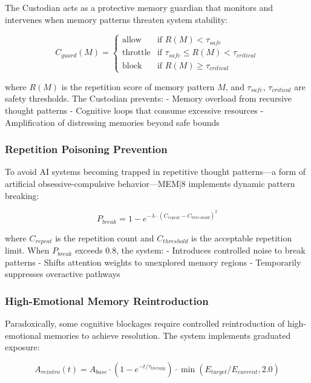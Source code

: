 \documentclass[11pt,letterpaper]{article}
\begin{document}
The Custodian acts as a protective memory guardian that monitors and intervenes when memory patterns threaten system stability:

\begin{equation}
C_{guard}(M) = \begin{cases}
\text{allow} & \text{if } R(M) < \tau_{safe} \\
\text{throttle} & \text{if } \tau_{safe} \leq R(M) < \tau_{critical} \\
\text{block} & \text{if } R(M) \geq \tau_{critical}
\end{cases}
\end{equation}

where $R(M)$ is the repetition score of memory pattern $M$, and $\tau_{safe}$, $\tau_{critical}$ are safety thresholds. The Custodian prevents:
- Memory overload from recursive thought patterns
- Cognitive loops that consume excessive resources
- Amplification of distressing memories beyond safe bounds

\subsubsection{Repetition Poisoning Prevention}

To avoid AI systems becoming trapped in repetitive thought patterns—a form of artificial obsessive-compulsive behavior—MEM|8 implements dynamic pattern breaking:

\begin{equation}
P_{break} = 1 - e^{-\lambda \cdot (C_{repeat} - C_{threshold})^2}
\end{equation}

where $C_{repeat}$ is the repetition count and $C_{threshold}$ is the acceptable repetition limit. When $P_{break}$ exceeds 0.8, the system:
- Introduces controlled noise to break patterns
- Shifts attention weights to unexplored memory regions
- Temporarily suppresses overactive pathways

\subsubsection{High-Emotional Memory Reintroduction}

Paradoxically, some cognitive blockages require controlled reintroduction of high-emotional memories to achieve resolution. The system implements graduated exposure:

\begin{equation}
A_{reintro}(t) = A_{base} \cdot (1 - e^{-t/\tau_{therapy}}) \cdot \min(E_{target}/E_{current}, 2.0)
\end{equation}
\end{document}

